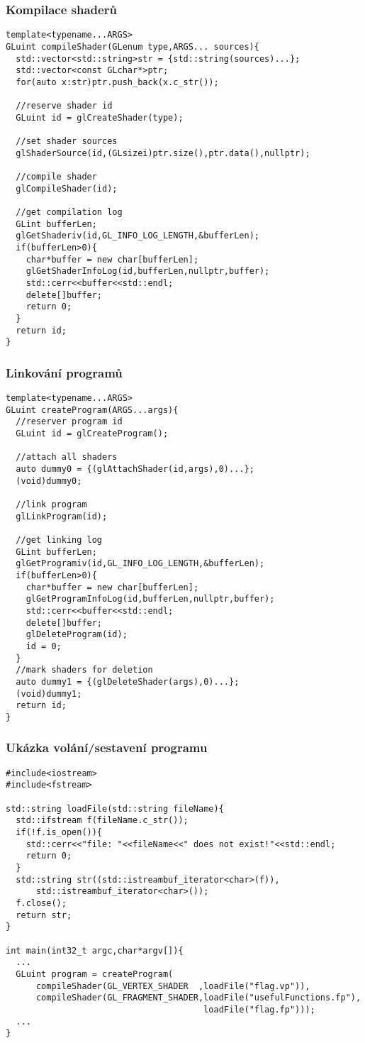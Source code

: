 \begin{frame}[fragile]
\frametitle{Kompilace shaderů}
    {\scriptsize
    \begin{verbatim}
template<typename...ARGS>
GLuint compileShader(GLenum type,ARGS... sources){
  std::vector<std::string>str = {std::string(sources)...};
  std::vector<const GLchar*>ptr;
  for(auto x:str)ptr.push_back(x.c_str());

  //reserve shader id
  GLuint id = glCreateShader(type);

  //set shader sources
  glShaderSource(id,(GLsizei)ptr.size(),ptr.data(),nullptr);

  //compile shader
  glCompileShader(id);

  //get compilation log
  GLint bufferLen;
  glGetShaderiv(id,GL_INFO_LOG_LENGTH,&bufferLen);
  if(bufferLen>0){
    char*buffer = new char[bufferLen];
    glGetShaderInfoLog(id,bufferLen,nullptr,buffer);
    std::cerr<<buffer<<std::endl;
    delete[]buffer;
    return 0;
  }
  return id;
}
    \end{verbatim}
    }
\end{frame}

\begin{frame}[fragile]
\frametitle{Linkování programů}
    {\scriptsize
    \begin{verbatim}
template<typename...ARGS>
GLuint createProgram(ARGS...args){
  //reserver program id
  GLuint id = glCreateProgram();

  //attach all shaders
  auto dummy0 = {(glAttachShader(id,args),0)...};
  (void)dummy0;

  //link program
  glLinkProgram(id);

  //get linking log
  GLint bufferLen;
  glGetProgramiv(id,GL_INFO_LOG_LENGTH,&bufferLen);
  if(bufferLen>0){
    char*buffer = new char[bufferLen];
    glGetProgramInfoLog(id,bufferLen,nullptr,buffer);
    std::cerr<<buffer<<std::endl;
    delete[]buffer;
    glDeleteProgram(id);
    id = 0;
  }
  //mark shaders for deletion
  auto dummy1 = {(glDeleteShader(args),0)...};
  (void)dummy1;
  return id;
}
    \end{verbatim}
    }
\end{frame}

\begin{frame}[fragile]
  \frametitle{Ukázka volání/sestavení programu}
    {\scriptsize
    \begin{verbatim}
#include<iostream>
#include<fstream>

std::string loadFile(std::string fileName){
  std::ifstream f(fileName.c_str());
  if(!f.is_open()){
    std::cerr<<"file: "<<fileName<<" does not exist!"<<std::endl;
    return 0;
  }
  std::string str((std::istreambuf_iterator<char>(f)),
      std::istreambuf_iterator<char>());
  f.close();
  return str;
}

int main(int32_t argc,char*argv[]){
  ...
  GLuint program = createProgram(
      compileShader(GL_VERTEX_SHADER  ,loadFile("flag.vp")),
      compileShader(GL_FRAGMENT_SHADER,loadFile("usefulFunctions.fp"),
                                       loadFile("flag.fp")));
  ...
}
    \end{verbatim}
    }
\end{frame}



